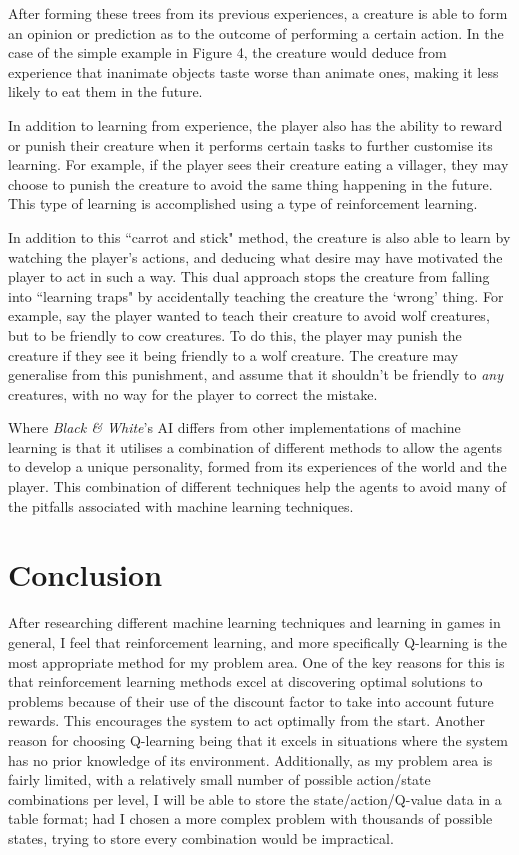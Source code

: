 \documentclass[a4paper,oneside]{report}
\begin{document}
After forming these trees from its previous experiences, a creature is able to form an opinion or prediction as to the outcome of performing a certain action. In the case of the simple example in Figure 4, the creature would deduce from experience that inanimate objects taste worse than animate ones, making it less likely to eat them in the future. 

In addition to learning from experience, the player also has the ability to reward or punish their creature when it performs certain tasks to further customise its learning. For example, if the player sees their creature eating a villager, they may choose to punish the creature to avoid the same thing happening in the future. This type of learning is accomplished using a type of reinforcement learning. 

In addition to this ``carrot and stick" method, the creature is also able to learn by watching the player's actions, and deducing what desire may have motivated the player to act in such a way. This dual approach stops the creature from falling into ``learning traps" by accidentally teaching the creature the `wrong' thing. For example, say the player wanted to teach their creature to avoid wolf creatures, but to be friendly to cow creatures. To do this, the player may punish the creature if they see it being friendly to a wolf creature. The creature may generalise from this punishment, and assume that it shouldn't be friendly to \emph{any} creatures, with no way for the player to correct the mistake. 

Where \emph{Black \& White}'s AI differs from other implementations of machine learning is that it utilises a combination of different methods to allow the agents to develop a unique personality, formed from its experiences of the world and the player. This combination of different techniques help the agents to avoid many of the pitfalls associated with machine learning techniques.

\section{Conclusion}

After researching different machine learning techniques and learning in games in general, I feel that reinforcement learning, and more specifically Q-learning is the most appropriate method for my problem area. One of the key reasons for this is that reinforcement learning methods excel at discovering optimal solutions to problems because of their use of the discount factor to take into account future rewards. This encourages the system to act optimally from the start. Another reason for choosing Q-learning being that it excels in situations where the system has no prior knowledge of its environment. Additionally, as my problem area is fairly limited, with a relatively small number of possible action/state combinations per level, I will be able to store the state/action/Q-value data in a table format; had I chosen a more complex problem with thousands of possible states, trying to store every combination would be impractical.
\end{document}
